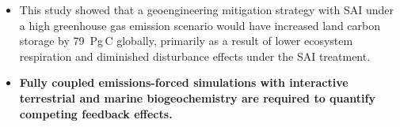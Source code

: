 \begin{itemize}
	\item This study showed that a geoengineering mitigation strategy with SAI under a high greenhouse gas emission scenario would have increased land carbon storage by 79~Pg\,C globally, primarily as a result of lower ecosystem respiration and diminished disturbance effects under the SAI treatment.

	\item \textbf{Fully coupled emissions-forced simulations with interactive terrestrial and marine biogeochemistry are required to quantify competing feedback effects.}
\end{itemize}

